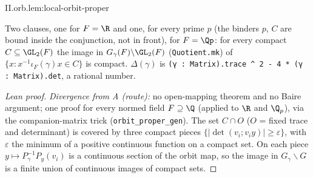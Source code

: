 \begin{lemma}
\end{lemma}
\begin{tfformal}{II.orb.lem:local-orbit-proper}
\begin{tffidelity}
Two clauses, one for $F=\R$ and one, for every prime $p$ (the binders $p$, $C$ are bound inside the conjunction, not in front), for $F=\Qp$: for every compact $C\subseteq\GL_2(F)$ the image in $G_\gamma(F)\backslash\GL_2(F)$ (\texttt{Quotient.mk}) of $\{x:x^{-1}\iota_F(\gamma)x\in C\}$ is compact. $\Delta(\gamma)$ is \texttt{(γ : Matrix).trace \^{} 2 - 4 * (γ : Matrix).det}, a rational number.
\end{tffidelity}
\end{tfformal}
\begin{proof}[Lean proof]
\emph{Divergence from A (route):} no open-mapping theorem and no Baire argument; one proof for every normed field $F\supseteq\Q$ (applied to $\R$ and $\Q_p$), via the companion-matrix trick (\texttt{orbit\_proper\_gen}). The set $C\cap O$ ($O$ = fixed trace and determinant) is covered by three compact pieces $\{|\det(v_i;v_iy)|\ge\varepsilon\}$, with $\varepsilon$ the minimum of a positive continuous function on a compact set. On each piece $y\mapsto P_\gamma^{-1}P_y(v_i)$ is a continuous section of the orbit map, so the image in $G_\gamma\backslash G$ is a finite union of continuous images of compact sets.
\end{proof}


